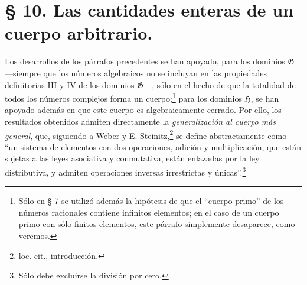 \documentclass[11pt]{article}
\begin{document}
\section*{§ 10. Las cantidades enteras de un cuerpo arbitrario.}

Los desarrollos de los párrafos precedentes se han apoyado, para los dominios $\mathfrak G$ ---siempre que los números algebraicos no se incluyan en las propiedades definitorias III y IV de los dominios $\mathfrak G$---, sólo en el hecho de que la totalidad de todos los números complejos forma un cuerpo;\footnote{Sólo en § 7 se utilizó además la hipótesis de que el ``cuerpo primo'' de los números racionales contiene infinitos elementos; en el caso de un cuerpo primo con sólo finitos elementos, este párrafo simplemente desaparece, como veremos.} para los dominios $\mathfrak H$, se han apoyado además en que este cuerpo es algebraicamente cerrado. Por ello, los resultados obtenidos admiten directamente la \emph{generalización al cuerpo más general}, que, siguiendo a Weber y E. Steinitz,\footnote{loc. cit., introducción.} se define abstractamente como ``un sistema de elementos con dos operaciones, adición y multiplicación, que están sujetas a las leyes asociativa y conmutativa, están enlazadas por la ley distributiva, y admiten operaciones inversas irrestrictas y únicas''.\footnote{Sólo debe excluirse la división por cero.}
\end{document}
